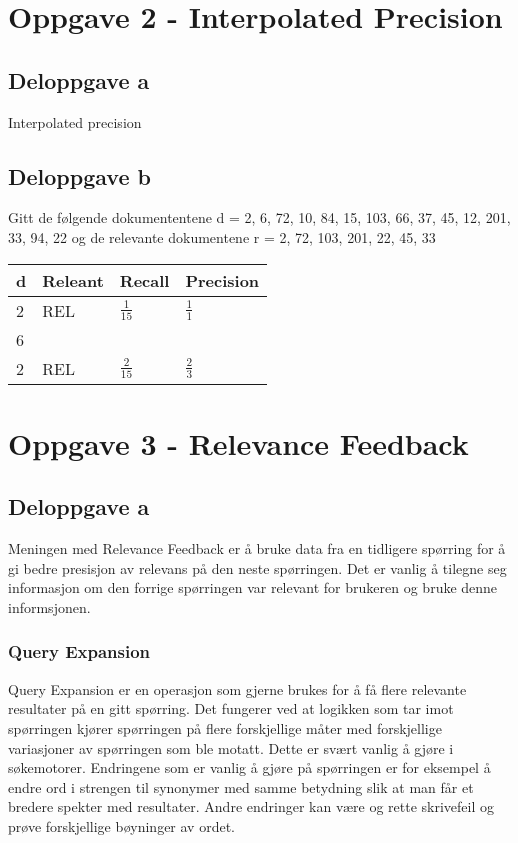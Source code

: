 \section*{Oppgave 2 - Interpolated Precision}
\subsection*{Deloppgave a}
Interpolated precision


\subsection*{Deloppgave b}

Gitt de følgende dokumententene d = {2, 6, 72, 10, 84, 15, 103, 66, 37, 45, 12, 201, 33, 94, 22}
og de relevante dokumentene r = {2, 72, 103, 201, 22, 45, 33}

\begin{center}
    \begin{tabular}{| l | l | l | l |}
    \hline
    d & Releant & Recall & Precision \\ \hline
    2 & REL & $\frac{1}{15}$ & $\frac{1}{1}$ \\ \hline
    6 &  &  & \\ \hline
    2 & REL & $\frac{2}{15}$ & $\frac{2}{3}$ \\ \hline
    \end{tabular}
\end{center}


\pagebreak
\section*{Oppgave 3 - Relevance Feedback}
\subsection*{Deloppgave a}
Meningen med Relevance Feedback er å bruke data fra en tidligere spørring for å gi bedre presisjon av relevans på den neste spørringen. Det er vanlig å tilegne seg informasjon om den forrige spørringen var relevant for brukeren og bruke denne informsjonen. 
\subsubsection*{Query Expansion}
Query Expansion er en operasjon som gjerne brukes for å få flere relevante resultater på en gitt spørring. Det fungerer ved at logikken som tar imot spørringen kjører spørringen på flere forskjellige måter med forskjellige variasjoner av spørringen som ble motatt. Dette er svært vanlig å gjøre i søkemotorer. Endringene som er vanlig å gjøre på spørringen er for eksempel å endre ord i strengen til synonymer med samme betydning slik at man får et bredere spekter med resultater. Andre endringer kan være og rette skrivefeil og prøve forskjellige bøyninger av ordet.
